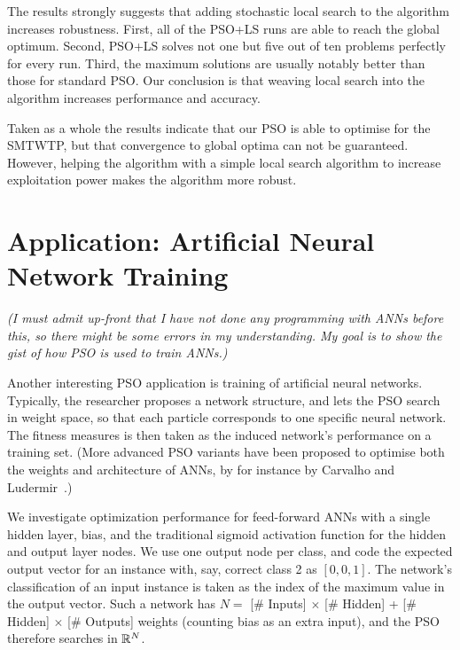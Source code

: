 \documentclass[a4paper,final,9pt]{article}
\begin{document}
The results strongly suggests that adding stochastic local search to the
algorithm increases robustness. First, all of the PSO+LS runs are able to
reach the global optimum. Second, PSO+LS solves not one but five out of ten
problems perfectly for every run. Third, the maximum solutions are usually
notably better than those for standard PSO. Our conclusion is that weaving local
search into the algorithm increases performance and accuracy. 

Taken as a whole the results indicate that our PSO is able to optimise for the
SMTWTP, but that convergence to global optima can not be guaranteed. However,
helping the algorithm with a simple local search algorithm to increase
exploitation power makes the algorithm more robust.  


\section{Application: Artificial Neural Network Training}
\label{sec:anal2}
{ \footnotesize \emph{(I must admit up-front that I have not done any
programming with ANNs before this, so there might be some errors in my
understanding.  My goal is to show the gist of how PSO is used to train
ANNs.)} }
\vspace{5pt}

\noindent
Another interesting PSO application is training of artificial neural networks.
Typically, the researcher proposes a network structure, and lets the PSO
search in weight space, so that each particle corresponds to one specific
neural network. The fitness measures is then taken as the induced network's
performance on a training set. (More advanced PSO variants have been proposed
to optimise both the weights and architecture of ANNs, by for instance
by Carvalho and Ludermir~\cite{carvalho}.)

We investigate optimization performance for feed-forward ANNs with a single
hidden layer, bias, and the traditional sigmoid activation function for the
hidden and output layer nodes. We use one output node per class, and code the
expected output vector for an instance with, say, correct class 2 as
$[0,0,1]$. The network's classification of an input instance is taken as the
index of the maximum value in the output vector. Such a network has $N = $ [\#
Inputs] $\times$ [\# Hidden] + [\# Hidden] $\times$ [\# Outputs] weights
(counting bias as an extra input), and the PSO therefore searches in
$\mathbb{R}^N$.
\end{document}
